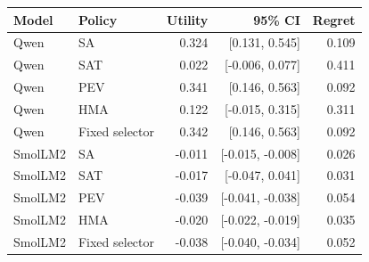 \begin{tabular}{llrrr}
\toprule
Model & Policy & Utility & 95\% CI & Regret \\
\midrule
Qwen & SA & 0.324 & [0.131, 0.545] & 0.109 \\
Qwen & SAT & 0.022 & [-0.006, 0.077] & 0.411 \\
Qwen & PEV & 0.341 & [0.146, 0.563] & 0.092 \\
Qwen & HMA & 0.122 & [-0.015, 0.315] & 0.311 \\
Qwen & Fixed selector & 0.342 & [0.146, 0.563] & 0.092 \\
SmolLM2 & SA & -0.011 & [-0.015, -0.008] & 0.026 \\
SmolLM2 & SAT & -0.017 & [-0.047, 0.041] & 0.031 \\
SmolLM2 & PEV & -0.039 & [-0.041, -0.038] & 0.054 \\
SmolLM2 & HMA & -0.020 & [-0.022, -0.019] & 0.035 \\
SmolLM2 & Fixed selector & -0.038 & [-0.040, -0.034] & 0.052 \\
\bottomrule
\end{tabular}
